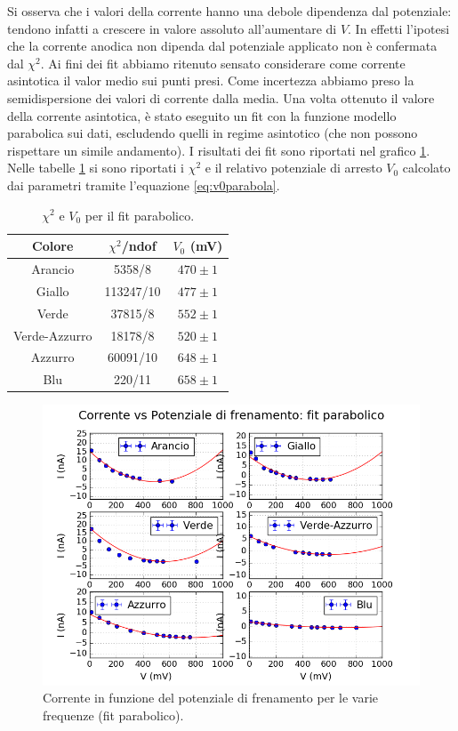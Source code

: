 \documentclass[10pt,a4paper]{article}
\begin{document}
Si osserva che i valori della corrente hanno una debole dipendenza dal potenziale: tendono infatti a crescere in valore assoluto all'aumentare di $V$.
In effetti l'ipotesi che la corrente anodica non dipenda dal potenziale applicato non è confermata dal $\chi ^2$.
Ai fini dei fit abbiamo ritenuto sensato considerare come corrente asintotica il valor medio sui punti presi.
Come incertezza abbiamo preso la semidispersione dei valori di corrente dalla media. Una volta ottenuto il valore della corrente asintotica, è stato eseguito un fit con la funzione modello parabolica sui dati, escludendo quelli in regime asintotico (che non possono rispettare un simile andamento).
I risultati dei fit sono riportati  nel grafico \ref{fig:fitparabolico}.
Nelle tabelle  \ref{tab:fitparabolico} si sono riportati i $\chi ^2$ e il relativo potenziale di arresto $V_0$ calcolato dai parametri tramite l'equazione \ref{eq:v0parabola}.

\begin{table}[!htb]
\centering
\begin{tabular}{|c|c|c|}
\hline
Colore & $\chi ^2$/ndof & $V_0$ (mV)\\
\hline
Arancio & 5358/8 & $470\pm 1$ \\
\hline
Giallo & 113247/10 & $477\pm 1$\\
\hline
Verde & 37815/8 & $ 552 \pm 1$\\
\hline
Verde-Azzurro & 18178/8 & $520\pm 1$\\
\hline
Azzurro & 60091/10 & $648\pm 1$\\
\hline
Blu & 220/11 & $658\pm 1$\\
\hline
\end{tabular}
\caption{$\chi^2$ e $V_0$ per il fit parabolico.\label{tab:fitparabolico}}
\end{table}


\begin{figure}[!htb]
\centering
\includegraphics[scale=0.9]{fitparabolico.png}
\caption{Corrente in funzione del potenziale di frenamento per le varie frequenze (fit parabolico).\label{fig:fitparabolico}}
\end{figure}
\end{document}
